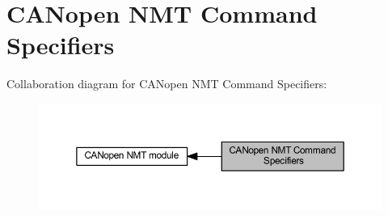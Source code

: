 \hypertarget{group___c_a_nopen___n_m_t__speficications}{}\section{C\+A\+Nopen N\+MT Command Specifiers}
\label{group___c_a_nopen___n_m_t__speficications}
Collaboration diagram for C\+A\+Nopen N\+MT Command Specifiers\+:\nopagebreak
\begin{figure}[H]
\begin{center}
\leavevmode
\includegraphics[width=350pt]{group___c_a_nopen___n_m_t__speficications}
\end{center}
\end{figure}
